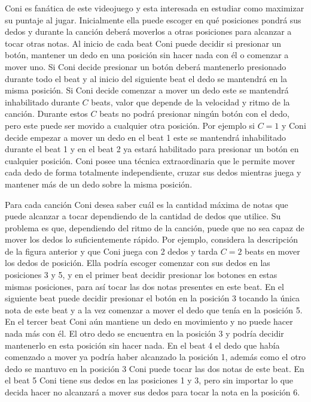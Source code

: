 \documentclass{oci}
\begin{document}
\begin{problemDescription}
  Coni es fanática de este videojuego y esta interesada en estudiar como
  maximizar su puntaje al jugar.
  Inicialmente ella puede escoger en qué posiciones pondrá sus dedos y durante
  la canción deberá moverlos a otras posiciones para alcanzar a tocar otras notas.
  Al inicio de cada beat Coni puede decidir si presionar un botón, mantener un
  dedo en una posición sin hacer nada con él o comenzar a mover uno.
  Si Coni decide presionar un botón deberá mantenerlo presionado durante todo el
  beat y al inicio del siguiente beat el dedo se mantendrá en la misma posición.
  Si Coni decide comenzar a mover un dedo este se mantendrá inhabilitado durante
  $C$ beats, valor que depende de la velocidad y ritmo de la canción.
  Durante estos $C$ beats no podrá presionar ningún botón con el dedo, pero este
  puede ser movido a cualquier otra posición.
  Por ejemplo si $C=1$ y Coni decide empezar a mover un dedo en el beat 1 este
  se mantendrá inhabilitado durante el beat 1 y en el beat 2 ya estará
  habilitado para presionar un botón en cualquier posición.
  Coni posee una técnica extraordinaria que le permite mover cada dedo
  de forma totalmente independiente, cruzar sus dedos mientras juega y mantener
  más de un dedo sobre la misma posición.

  Para cada canción Coni desea saber cuál es la cantidad máxima de notas que
  puede alcanzar a tocar dependiendo de la cantidad de dedos que utilice.
  Su problema es que, dependiendo del ritmo de la canción, puede que no sea
  capaz de mover los dedos lo suficientemente rápido.
  Por ejemplo, considera la descripción de la figura anterior y que Coni juega
  con 2 dedos y tarda $C=2$ beats en mover los dedos de posición.
  Ella podría escoger comenzar con sus dedos en las posiciones 3 y 5, y en el
  primer beat decidir presionar los botones en estas mismas posiciones, para así
  tocar las dos notas presentes en este beat.
  En el siguiente beat puede decidir presionar el botón en la posición 3
  tocando la única nota de este beat y a la vez comenzar a mover el dedo que
  tenía en la posición 5.
  En el tercer beat Coni aún mantiene un dedo en movimiento y no puede hacer nada
  más con él.
  El otro dedo se encuentra en la posición 3 y podría decidir mantenerlo en esta
  posición sin hacer nada.
  En el beat 4 el dedo que había comenzado a mover ya podría haber alcanzado
  la posición 1, además como el otro dedo se mantuvo en la posición 3 Coni puede
  tocar las dos notas de este beat.
  En el beat 5 Coni tiene sus dedos en las posiciones 1 y 3, pero sin importar
  lo que decida hacer no alcanzará a mover sus dedos para tocar la nota en la
  posición 6.
\end{problemDescription}
\end{document}

